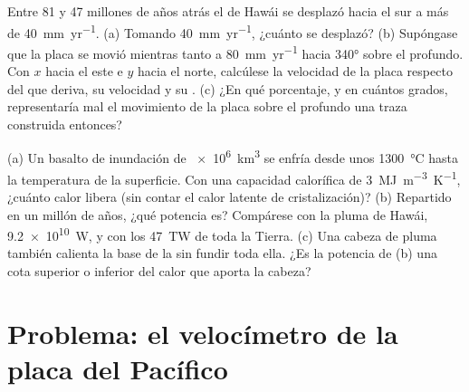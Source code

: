 \begin{exercise}[$\star\star\star$]\label{exo:b1:hotspots:11}
Entre 81 y 47 millones de años atrás el  de Hawái se desplazó hacia el sur a más de \qty{40}{mm.yr^{-1}}. (a) Tomando \qty{40}{mm.yr^{-1}},
¿cuánto se desplazó? (b) Supóngase que la placa se movió mientras tanto a \qty{80}{mm.yr^{-1}} hacia \ang{340} sobre el  profundo. Con $x$ hacia el este
e $y$ hacia el norte, calcúlese la velocidad de la placa respecto del  que deriva, su velocidad y su . (c) ¿En qué porcentaje, y en cuántos
grados, representaría mal el movimiento de la placa sobre el  profundo una traza construida entonces?
\end{exercise}

\begin{exercise}[$\star\star\star$]\label{exo:b1:hotspots:12}
(a) Un basalto de inundación de \qty{e6}{km^3} se enfría desde unos \qty{1300}{\celsius} hasta la temperatura de la superficie. Con una capacidad calorífica
de \qty{3}{MJ.m^{-3}.K^{-1}}, ¿cuánto calor libera (sin contar el calor latente de cristalización)? (b) Repartido en un millón de años, ¿qué potencia es? Compárese
con la pluma de Hawái, \qty{9.2e10}{W}, y con los \qty{47}{TW} de toda la Tierra. (c) Una cabeza de pluma también calienta la base de la  sin fundir toda
ella. ¿Es la potencia de (b) una cota superior o inferior del calor que aporta la cabeza?
\end{exercise}

\section{Problema: el velocímetro de la placa del Pacífico}

